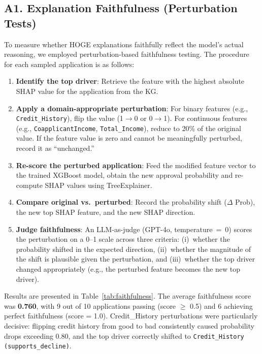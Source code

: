 \documentclass[lnbip]{svmultln}
\begin{document}
\subsection{A1. Explanation Faithfulness (Perturbation Tests)}

To measure whether HOGE explanations faithfully reflect the model's actual reasoning, we employed perturbation-based faithfulness testing. The procedure for each sampled application is as follows:

\begin{enumerate}
    \item \textbf{Identify the top driver}: Retrieve the feature with the highest absolute SHAP value for the application from the KG.
    \item \textbf{Apply a domain-appropriate perturbation}: For binary features (e.g., \texttt{Credit\_History}), flip the value (1$\to$0 or 0$\to$1). For continuous features (e.g., \texttt{CoapplicantIncome}, \texttt{Total\_Income}), reduce to 20\% of the original value. If the feature value is zero and cannot be meaningfully perturbed, record it as ``unchanged.''
    \item \textbf{Re-score the perturbed application}: Feed the modified feature vector to the trained XGBoost model, obtain the new approval probability and re-compute SHAP values using TreeExplainer.
    \item \textbf{Compare original vs.\ perturbed}: Record the probability shift ($\Delta$ Prob), the new top SHAP feature, and the new SHAP direction.
    \item \textbf{Judge faithfulness}: An LLM-as-judge (GPT-4o, temperature~=~0) scores the perturbation on a 0--1 scale across three criteria: (i)~whether the probability shifted in the expected direction, (ii)~whether the magnitude of the shift is plausible given the perturbation, and (iii)~whether the top driver changed appropriately (e.g., the perturbed feature becomes the new top driver).
\end{enumerate}

Results are presented in Table~\ref{tab:faithfulness}. The average faithfulness score was \textbf{0.760}, with 9 out of 10 applications passing (score $\geq$ 0.5) and 6 achieving perfect faithfulness (score = 1.0). Credit\_History perturbations were particularly decisive: flipping credit history from good to bad consistently caused probability drops exceeding 0.80, and the top driver correctly shifted to \texttt{Credit\_History (supports\_decline)}.
\end{document}
